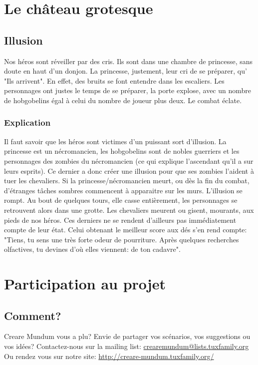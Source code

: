 \documentclass[a4paper, 11pt]{article}
\begin{document}
\section{Le château grotesque}
\subsection{Illusion}
Nos héros sont réveiller par des cris. Ils sont dans une chambre de princesse, sans doute en haut d'un donjon. La princesse, justement, leur cri de se préparer, qu' "Ils arrivent". En effet, des bruits se font entendre dans les escaliers. Les personnages ont justes le temps de se préparer, la porte explose, avec un nombre de hobgobelins égal à celui du nombre de joueur plus deux. Le combat éclate. 

\subsubsection{Explication} 
Il faut savoir que les héros sont victimes d'un puissant sort d'illusion. La princesse est un nécromancien, les hobgobelins sont de nobles guerriers et les personnages des zombies du nécromancien (ce qui explique l'ascendant qu'il a sur leurs esprits). Ce dernier a donc créer une illusion pour que ses zombies l'aident à tuer les chevaliers. Si la princesse/nécromancien meurt, ou dès la fin du combat, d'étranges tâches sombres commencent à apparaitre sur les murs. L'illusion se rompt. Au bout de quelques tours, elle casse entièrement, les personnages se retrouvent alors dans une grotte.
\newline
Les chevaliers meurent ou gisent, mourants, aux pieds de nos héros. Ces derniers ne se rendent d’ailleurs pas immédiatement compte de leur état. Celui obtenant le meilleur score aux dés s'en rend compte: "Tiens, tu sens une très forte odeur de pourriture. Après quelques recherches olfactives, tu devines d'où elles viennent: de ton cadavre".


\newpage
\section{Participation au projet}
\subsection{Comment?}
\hypertarget{participation}{}
Creare Mundum vous a plu? 
Envie de partager vos scénarios, vos suggestions ou vos idées?
\newline
Contactez-nous sur la mailing list: \href {mailto:crearemundum@lists.tuxfamily.org}{crearemundum@lists.tuxfamily.org}
\newline
Ou rendez vous sur notre site: \href {http://creare-mundum.tuxfamily.org/} {http://creare-mundum.tuxfamily.org/}
\end{document}
